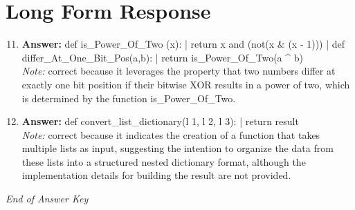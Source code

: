 \documentclass[12pt]{article}
\begin{document}
\section*{Long Form Response}
\begin{enumerate}[label=\arabic*.]
\setcounter{enumi}{10}
\item \textbf{Answer:} def is\_Power\_Of\_Two (x): | return x and (not(x \& (x - 1))) | def differ\_At\_One\_Bit\_Pos(a,b): | return is\_Power\_Of\_Two(a ^ b)
\\ \textit{Note:} correct because it leverages the property that two numbers differ at exactly one bit position if their bitwise XOR results in a power of two, which is determined by the function is\_Power\_Of\_Two.
\item \textbf{Answer:} def convert\_list\_dictionary(l 1, l 2, l 3): | return result
\\ \textit{Note:} correct because it indicates the creation of a function that takes multiple lists as input, suggesting the intention to organize the data from these lists into a structured nested dictionary format, although the implementation details for building the result are not provided.
\end{enumerate}

\vfill
\noindent\textit{End of Answer Key}
\end{document}
